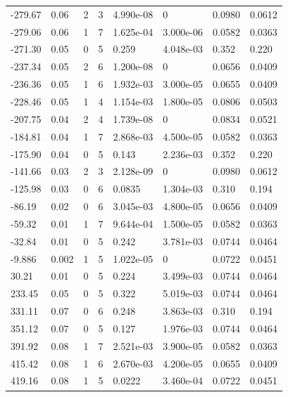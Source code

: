 \documentclass[preview]{standalone}
\begin{document}
{{\begin{tabular}{L{1.2cm}C{1.2cm} C{0.3cm}C{0.5cm} C{1.4cm}C{1.4cm} C{1.4cm}C{1.4cm}}
  -279.67  &  0.06  & 2     &  3 &  4.990e-08  & 0  & 0.0980 &  0.0612   \\ 
  -279.06  &  0.06  & 1     &  7 &  1.625e-04  & 3.000e-06  & 0.0582 &  0.0363   \\ 
  -271.30  &  0.05  & 0     &  5 &  0.259  & 4.048e-03  & 0.352 &  0.220   \\ 
  -237.34  &  0.05  & 2     &  6 &  1.200e-08  & 0  & 0.0656 &  0.0409   \\ 
  -236.36  &  0.05  & 1     &  6 &  1.932e-03  & 3.000e-05  & 0.0655 &  0.0409   \\ 
  -228.46  &  0.05  & 1     &  4 &  1.154e-03  & 1.800e-05  & 0.0806 &  0.0503   \\ 
  -207.75  &  0.04  & 2     &  4 &  1.739e-08  & 0  & 0.0834 &  0.0521   \\ 
  -184.81  &  0.04  & 1     &  7 &  2.868e-03  & 4.500e-05  & 0.0582 &  0.0363   \\ 
  -175.90  &  0.04  & 0     &  5 &  0.143  & 2.236e-03  & 0.352 &  0.220   \\ 
  -141.66  &  0.03  & 2     &  3 &  2.128e-09  & 0  & 0.0980 &  0.0612   \\ 
  -125.98  &  0.03  & 0     &  6 &  0.0835  & 1.304e-03  & 0.310 &  0.194   \\ 
  -86.19  &  0.02  & 0     &  6 &  3.045e-03  & 4.800e-05  & 0.0656 &  0.0409   \\ 
  -59.32  &  0.01  & 1     &  7 &  9.644e-04  & 1.500e-05  & 0.0582 &  0.0363   \\ 
  -32.84  &  0.01  & 0     &  5 &  0.242  & 3.781e-03  & 0.0744 &  0.0464   \\ 
  -9.886  &  0.002  & 1     &  5 &  1.022e-05  & 0  & 0.0722 &  0.0451   \\ 
  30.21  &  0.01  & 0     &  5 &  0.224  & 3.499e-03  & 0.0744 &  0.0464   \\ 
  233.45  &  0.05  & 0     &  5 &  0.322  & 5.019e-03  & 0.0744 &  0.0464   \\ 
  331.11  &  0.07  & 0     &  6 &  0.248  & 3.863e-03  & 0.310 &  0.194   \\ 
  351.12  &  0.07  & 0     &  5 &  0.127  & 1.976e-03  & 0.0744 &  0.0464   \\ 
  391.92  &  0.08  & 1     &  7 &  2.521e-03  & 3.900e-05  & 0.0582 &  0.0363   \\ 
  415.42  &  0.08  & 1     &  6 &  2.670e-03  & 4.200e-05  & 0.0655 &  0.0409   \\ 
  419.16  &  0.08  & 1     &  5 &  0.0222  & 3.460e-04  & 0.0722 &  0.0451   \\ 

\end{tabular}}}
\end{document}
